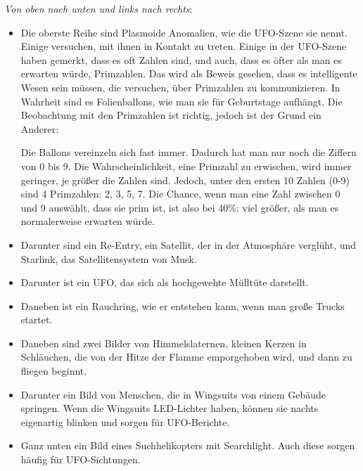 \documentclass{scrartcl}
\begin{document}
\textit{Von oben nach unten und links nach rechts}:

\begin{itemize}
	\item Die oberste Reihe sind \frq Plasmoide Anomalien\flq, wie die UFO-Szene sie nennt. Einige versuchen, mit ihnen in Kontakt zu treten. Einige in der UFO-Szene haben gemerkt, dass es oft Zahlen sind, und auch, dass es öfter als man es erwarten würde, Primzahlen. Das wird als Beweis gesehen, dass es intelligente Wesen sein müssen, die versuchen, über Primzahlen zu kommunizieren. In Wahrheit sind es Folienballons, wie man sie für Geburtstage aufhängt. Die Beobachtung mit den Primzahlen ist richtig, jedoch ist der Grund ein Anderer:

		Die Ballons vereinzeln sich fast immer. Dadurch hat man nur noch die Ziffern von 0 bis 9. Die Wahrscheinlichkeit, eine Primzahl zu \frq erwischen\flq, wird immer geringer, je größer die Zahlen sind. Jedoch, unter den ersten 10 Zahlen (0-9) sind 4 Primzahlen: 2, 3, 5, 7. Die Chance, wenn man eine Zahl zwischen 0 und 9 auswählt, dass sie prim ist, ist also bei 40\%: viel größer, als man es normalerweise erwarten würde.
	\item Darunter sind ein Re-Entry, ein Satellit, der in der Atmosphäre verglüht, und Starlink, das Satellitensystem von Musk.
	\item Darunter ist ein UFO, das sich als hochgewehte Mülltüte darstellt.
	\item Daneben ist ein Rauchring, wie er entstehen kann, wenn man große Trucks startet. 
	\item Daneben sind zwei Bilder von Himmelslaternen, kleinen Kerzen in \frq Schläuchen\flq, die von der Hitze der Flamme emporgehoben wird, und dann zu fliegen beginnt.
	\item Darunter ein Bild von Menschen, die in Wingsuits von einem Gebäude springen. Wenn die Wingsuits LED-Lichter haben, können sie nachts eigenartig blinken und sorgen für UFO-Berichte.
	\item Ganz unten ein Bild eines Suchhelikopters mit Searchlight. Auch diese sorgen häufig für UFO-Sichtungen.
\end{itemize}
\end{document}
